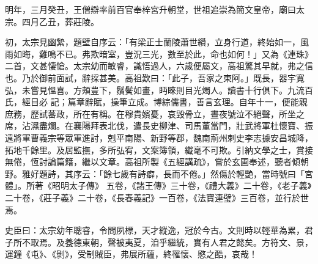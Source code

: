 \begin{pinyinscope}
 明年，三月癸丑，王僧辯率前百官奉梓宮升朝堂，世祖追崇為簡文皇帝，廟曰太宗。四月乙丑，葬莊陵。



 初，太宗見幽縶，題壁自序云：「有梁正士蘭陵蕭世纘，立身行道，終始如一，風雨如晦，雞鳴不已。弗欺暗室，豈況三光，數至於此，命也如何！」又為《連珠》二首，文甚悽愴。太宗幼而敏睿，識悟過人，六歲便屬文，高祖驚其早就，弗之信也。乃於御前面試，辭採甚美。高祖歎曰：「此子，吾家之東阿。」既長，器宇寬弘，未嘗見慍喜。方頰豊下，鬚鬢如畫，眄睞則目光燭人。讀書十行俱下。九流百氏，經目必
 記；篇章辭賦，操筆立成。博綜儒書，善言玄理。自年十一，便能親庶務，歷試蕃政，所在有稱。在穆貴嬪憂，哀毀骨立，晝夜號泣不絕聲，所坐之席，沾濕盡爛。在襄陽拜表北伐，遣長史柳津、司馬董當門，壯武將軍杜懷寶、振遠將軍曹義宗等眾軍進討，剋平南陽、新野等郡，魏南荊州刺史李志據安昌城降，拓地千餘里。及居監撫，多所弘宥，文案簿領，纖毫不可欺。引納文學之士，賞接無倦，恆討論篇籍，繼以文章。高祖所製《五經講疏》，嘗於玄圃奉述，聽者傾朝野。雅好題詩，其序云：「餘七歲有詩癖，長而不倦。」然傷於輕艷，當時號曰「宮體」。所著《昭明太子傳》
 五卷，《諸王傳》三十卷，《禮大義》二十卷，《老子義》二十卷，《莊子義》二十卷，《長春義記》一百卷，《法寶連璧》三百卷，並行於世焉。



 史臣曰：太宗幼年聰睿，令問夙標，天才縱逸，冠於今古。文則時以輕華為累，君子所不取焉。及養德東朝，聲被夷夏，洎乎繼統，實有人君之懿矣。方符文、景，運鐘《屯》、《剝》，受制賊臣，弗展所蘊，終罹懷、愍之酷，哀哉！



\end{pinyinscope}